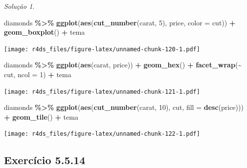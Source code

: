 \documentclass[
]{latex/krantz}
\newenvironment{Shaded}{\begin{snugshade}}{\end{snugshade}}
\newcommand{\AttributeTok}[1]{\textcolor[rgb]{0.13,0.29,0.53}{#1}}
\newcommand{\DecValTok}[1]{\textcolor[rgb]{0.00,0.00,0.81}{#1}}
\newcommand{\FunctionTok}[1]{\textcolor[rgb]{0.13,0.29,0.53}{\textbf{#1}}}
\newcommand{\NormalTok}[1]{#1}
\newcommand{\SpecialCharTok}[1]{\textcolor[rgb]{0.81,0.36,0.00}{\textbf{#1}}}
\theoremstyle{definition}
\theoremstyle{definition}
\theoremstyle{definition}
\theoremstyle{definition}
\theoremstyle{remark}
\newtheorem*{solution}{Solução}
\begin{document}
\begin{solution}
\leavevmode

\begin{Shaded}
\begin{Highlighting}[]
\NormalTok{diamonds }\SpecialCharTok{\%\textgreater{}\%}
    \FunctionTok{ggplot}\NormalTok{(}\FunctionTok{aes}\NormalTok{(}\FunctionTok{cut\_number}\NormalTok{(carat, }\DecValTok{5}\NormalTok{), price, }\AttributeTok{color =}\NormalTok{ cut)) }\SpecialCharTok{+}
        \FunctionTok{geom\_boxplot}\NormalTok{() }\SpecialCharTok{+}
\NormalTok{        tema}
\end{Highlighting}
\end{Shaded}

\texttt{[image: r4ds\_files/figure-latex/unnamed-chunk-120-1.pdf]}

\begin{Shaded}
\begin{Highlighting}[]
\NormalTok{diamonds }\SpecialCharTok{\%\textgreater{}\%}
    \FunctionTok{ggplot}\NormalTok{(}\FunctionTok{aes}\NormalTok{(carat, price)) }\SpecialCharTok{+}
        \FunctionTok{geom\_hex}\NormalTok{() }\SpecialCharTok{+}
        \FunctionTok{facet\_wrap}\NormalTok{(}\SpecialCharTok{\textasciitilde{}}\NormalTok{ cut, }\AttributeTok{ncol =} \DecValTok{1}\NormalTok{) }\SpecialCharTok{+}
\NormalTok{        tema}
\end{Highlighting}
\end{Shaded}

\texttt{[image: r4ds\_files/figure-latex/unnamed-chunk-121-1.pdf]}

\begin{Shaded}
\begin{Highlighting}[]
\NormalTok{diamonds }\SpecialCharTok{\%\textgreater{}\%}
    \FunctionTok{ggplot}\NormalTok{(}\FunctionTok{aes}\NormalTok{(}\FunctionTok{cut\_number}\NormalTok{(carat, }\DecValTok{10}\NormalTok{), cut, }\AttributeTok{fill =} \FunctionTok{desc}\NormalTok{(price))) }\SpecialCharTok{+}
        \FunctionTok{geom\_tile}\NormalTok{() }\SpecialCharTok{+}        
\NormalTok{        tema}
\end{Highlighting}
\end{Shaded}

\texttt{[image: r4ds\_files/figure-latex/unnamed-chunk-122-1.pdf]}

\end{solution}

\hypertarget{exr5-5-14}{%
\subsection*{Exercício 5.5.14}\label{exr5-5-14}}
\end{document}
